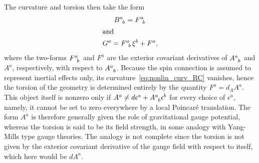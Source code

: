 \documentclass[
final,
11pt,
a4paper,
DIV=11,
headinclude=true,
footinclude=false,
bibliography=totoc,
twoside=true,  %
BCOR=5mm
]{scrbook}
\begin{document}
The curvature and torsion then take the form
\begin{subequations}
\label{eqs:nonlin_curv_tors_RC}
\begin{gather}
  \label{eq:nonlin_curv_RC}
  B\ind{^a_b} = F\ind{^a_b}
  \\
  \shortintertext{and}
  \label{eq:nonlin_tors_RC}
  G^a = F\ind{^a_b}\xi^b + F^a,
\end{gather}
\end{subequations}
where the two-forms $F\ind{^a_b}$ and $F^a$ are the exterior 
covariant derivatives of $A\ind{^a_b}$ and $A^a$, respectively, 
with respect to $A\ind{^a_b}$. Because the spin connection is 
assumed to represent inertial effects only, its 
curvature~\eqref{eq:nonlin_curv_RC} vanishes, hence the torsion 
of the geometry is determined entirely by the quantity $F^a = d_A 
A^a$.  This object itself is nonzero only if $A^a \neq 
d\epsilon^a + A\ind{^a_b} \epsilon^b$ for every choice of 
$\epsilon^a$, namely, it cannot be set to zero everywhere by 
a local Poincar\'e translation. The form $A^a$ is therefore 
generally given the role of gravitational gauge potential, 
whereas the torsion is said to be its field strength, in some 
analogy with Yang-Mills type gauge theories.  The analogy is not 
complete since the torsion is not given by the exterior covariant 
derivative of the gauge field with respect to itself, which here 
would be $dA^a$.
\end{document}
